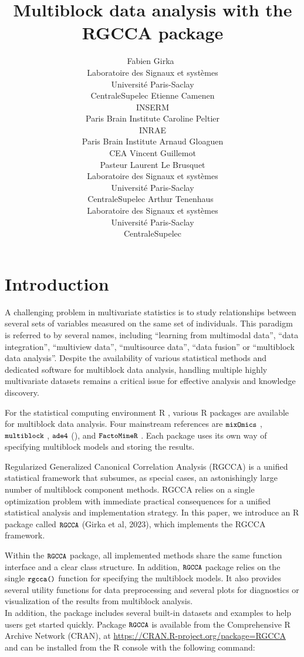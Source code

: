 \documentclass[
]{jss}
\author{
Fabien Girka~\orcidlink{0000-0003-2843-1104}\\Laboratoire des Signaux et
systèmes\\
Université Paris-Saclay\\
CentraleSupelec \And Etienne Camenen\\INSERM\\
Paris Brain Institute \And Caroline Peltier\\INRAE\\
Paris Brain Institute \AND Arnaud Gloaguen\\CEA \And Vincent
Guillemot\\Pasteur \AND Laurent Le Brusquet\\Laboratoire des
Signaux et systèmes\\
Université Paris-Saclay\\
CentraleSupelec \And Arthur
Tenenhaus~\orcidlink{0000-0000-0000-0000}\\Laboratoire des Signaux et
systèmes\\
Université Paris-Saclay\\
CentraleSupelec
}
\title{Multiblock data analysis with the RGCCA package}
\begin{document}
\newtheorem{theorem}{theorem}[section]%
\newtheorem{lemma}[theorem]{Lemma}
\newtheorem{proposition}[theorem]{Proposition}
\newtheorem{corollary}[theorem]{Corollary}
\newtheorem{remark}[theorem]{Remark}

\hypertarget{introduction}{%
\section{Introduction}\label{introduction}}

A challenging problem in multivariate statistics is to study
relationships between several sets of variables measured on the same set
of individuals. This paradigm is referred to by several names, including
``learning from multimodal data'', ``data integration'', ``multiview
data'', ``multisource data'', ``data fusion'' or ``multiblock data
analysis''. Despite the availability of various statistical methods and
dedicated software for multiblock data analysis, handling multiple
highly multivariate datasets remains a critical issue for effective
analysis and knowledge discovery.

For the statistical computing environment R \cite{R2022}, various R
packages are available for multiblock data analysis. Four mainstream
references are \(\small{\texttt{mixOmics}}\) \cite{Rohart2017},
\(\small{\texttt{multiblock}}\) \cite{Liland2022},
\(\small{\texttt{ade4}}\) (\cite{Dray2007}), and
\(\small{\texttt{FactoMineR}}\) \cite{Le2008}. Each package uses its own
way of specifying multiblock models and storing the results.

Regularized Generalized Canonical Correlation Analysis (RGCCA) is a
unified statistical framework that subsumes, as special cases, an
astonishingly large number of multiblock component methods. RGCCA relies
on a single optimization problem with immediate practical consequences
for a unified statistical analysis and implementation strategy. In this
paper, we introduce an R package called \(\small{\texttt{RGCCA}}\)
(Girka et al, 2023), which implements the RGCCA framework.

Within the \(\small{\texttt{RGCCA}}\) package, all implemented methods
share the same function interface and a clear class structure. In
addition, \(\small{\texttt{RGCCA}}\) package relies on the single
\(\small{\texttt{rgcca()}}\) function for specifying the multiblock
models. It also provides several utility functions for data
preprocessing and several plots for diagnostics or visualization of the
results from multiblock analysis.\\
In addition, the package includes several built-in datasets and examples
to help users get started quickly. Package \(\small{\texttt{RGCCA}}\) is
available from the Comprehensive R Archive Network (CRAN), at
\url{https://CRAN.R-project.org/package=RGCCA} and can be installed from
the R console with the following command:
\end{document}
